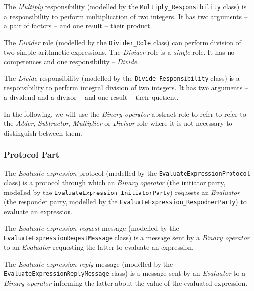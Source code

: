 The \textit{Multiply} responsibility (modelled by the \texttt{Multiply\_Responsibility} class) is a responsibility to perform multiplication of two integers.
It has two arguments -- a pair of factors -- and one result -- their product.

The \textit{Divider} role (modelled by the \texttt{Divider\_Role} class) can perform division of two simple arithmetic expressions.
The \textit{Divider} role is a \textit{single} role.
It has no competences and one responsibility -- \textit{Divide}. 

The \textit{Divide} responsibility (modelled by the \texttt{Divide\_Responsibility} class) is a responsibility to perform integral division of two integers.
It has two arguments -- a dividend and a divisor -- and one result -- their quotient.

In the following, we will use the \textit{Binary operator} abstract role to refer to refer to the \textit{Adder}, \textit{Subtractor}, \textit{Multiplier} or \textit{Divisor} role where it is not necessary to distinguish between them.

\subsubsection*{Protocol Part}

The \textit{Evaluate expression} protocol (modelled by the \texttt{EvaluateExpressionProtocol} class) is a protocol through which an \textit{Binary operator} (the initiator party, modelled by the \texttt{EvaluateExpression\_InitiatorParty}) requests an \textit{Evaluator} (the responder party, modelled by the \texttt{EvaluateExpression\_RespodnerParty}) to evaluate an expression.

The \textit{Evaluate expression request} message (modelled by the \texttt{EvaluateExpressionReqestMessage} class) is a message sent by a \textit{Binary operator} to an \textit{Evaluator} requesting the latter to evaluate an expression.

The \textit{Evaluate expression reply} message (modelled by the \texttt{EvaluateExpressionReplyMessage} class) is a message sent by an \textit{Evaluator} to a \textit{Binary operator} informing the latter about the value of the evaluated expression.


